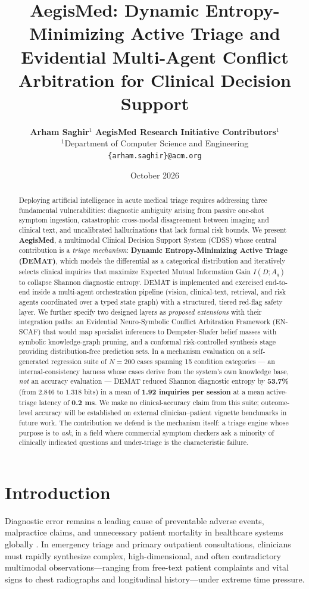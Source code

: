 \documentclass[10pt,twocolumn]{article}
\title{\textbf{AegisMed: Dynamic Entropy-Minimizing Active Triage and Evidential Multi-Agent Conflict Arbitration for Clinical Decision Support}}
\author{
    \textbf{Arham Saghir}$^{1}$ \quad \textbf{AegisMed Research Initiative Contributors}$^{1}$ \\
    $^{1}$Department of Computer Science and Engineering \\
    \texttt{\{arham.saghir\}@acm.org}
}
\date{October 2026}
\begin{document}
\maketitle

\begin{abstract}
\noindent Deploying artificial intelligence in acute medical triage requires addressing three fundamental vulnerabilities: diagnostic ambiguity arising from passive one-shot symptom ingestion, catastrophic cross-modal disagreement between imaging and clinical text, and uncalibrated hallucinations that lack formal risk bounds. We present \textbf{AegisMed}, a multimodal Clinical Decision Support System (CDSS) whose central contribution is a \emph{triage mechanism}: \textbf{Dynamic Entropy-Minimizing Active Triage (DEMAT)}, which models the differential as a categorical distribution and iteratively selects clinical inquiries that maximize Expected Mutual Information Gain $I(D; A_q)$ to collapse Shannon diagnostic entropy. DEMAT is implemented and exercised end-to-end inside a multi-agent orchestration pipeline (vision, clinical-text, retrieval, and risk agents coordinated over a typed state graph) with a structured, tiered red-flag safety layer. We further specify two designed layers as \emph{proposed extensions} with their integration paths: an Evidential Neuro-Symbolic Conflict Arbitration Framework (EN-SCAF) that would map specialist inferences to Dempster-Shafer belief masses with symbolic knowledge-graph pruning, and a conformal risk-controlled synthesis stage providing distribution-free prediction sets. In a mechanism evaluation on a self-generated regression suite of $N = 200$ cases spanning 15 condition categories --- an internal-consistency harness whose cases derive from the system's own knowledge base, \emph{not} an accuracy evaluation --- DEMAT reduced Shannon diagnostic entropy by \textbf{53.7\%} (from $2.846$ to $1.318$ bits) in a mean of \textbf{1.92 inquiries per session} at a mean active-triage latency of \textbf{0.2 ms}. We make no clinical-accuracy claim from this suite; outcome-level accuracy will be established on external clinician--patient vignette benchmarks in future work. The contribution we defend is the mechanism itself: a triage engine whose purpose is to \emph{ask}, in a field where commercial symptom checkers ask a minority of clinically indicated questions and under-triage is the characteristic failure.
\end{abstract}

\section{Introduction}
Diagnostic error remains a leading cause of preventable adverse events, malpractice claims, and unnecessary patient mortality in healthcare systems globally \cite{johnson2019mimic}. In emergency triage and primary outpatient consultations, clinicians must rapidly synthesize complex, high-dimensional, and often contradictory multimodal observations—ranging from free-text patient complaints and vital signs to chest radiographs and longitudinal history—under extreme time pressure.
\end{document}
